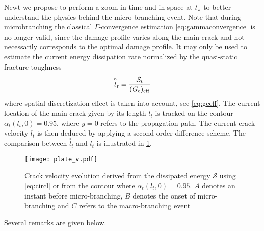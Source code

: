 Newt we propose to perform a zoom in time and in space at $t_{\mathrm{c}}$ to better understand the physics behind the micro-branching event. Note that during microbranching the classical $\Gamma$-convergence estimation \eqref{eq:gammaconvergence} is no longer valid, since the damage profile varies along the main crack and not necessarily corresponds to the optimal damage profile. It may only be used to estimate the current energy dissipation rate normalized by the quasi-static fracture toughness
\begin{equation} \label{eq:circl}
\overset{\circ}{l}_t=\frac{\dot{\mathcal{S}}_t}{(G_\mathrm{c})_\mathrm{eff}}
\end{equation}
where spatial discretization effect is taken into account, see \eqref{eq:gceff}. The current location of the main crack given by its length $l_t$ is tracked on the contour $\alpha_t(l_t,0)=0.95$, where $y=0$ refers to the propagation path. The current crack velocity $\dot{l}_t$ is then deduced by applying a second-order difference scheme. The comparison between $\overset{\circ}{l}_t$ and $\dot{l}_t$ is illustrated in \cref{fig:plate-v}.
\begin{figure}[htbp]
\centering
\texttt{[image: plate\_v.pdf]}
\caption{Crack velocity evolution derived from the dissipated energy $\mathcal{S}$ using \eqref{eq:circl} or from the contour where $\alpha_t(l_t,0)=0.95$. $A$ denotes an instant before micro-branching, $B$ denotes the onset of micro-branching and $C$ refers to the macro-branching event} \label{fig:plate-v}
\end{figure}
Several remarks are given below.

